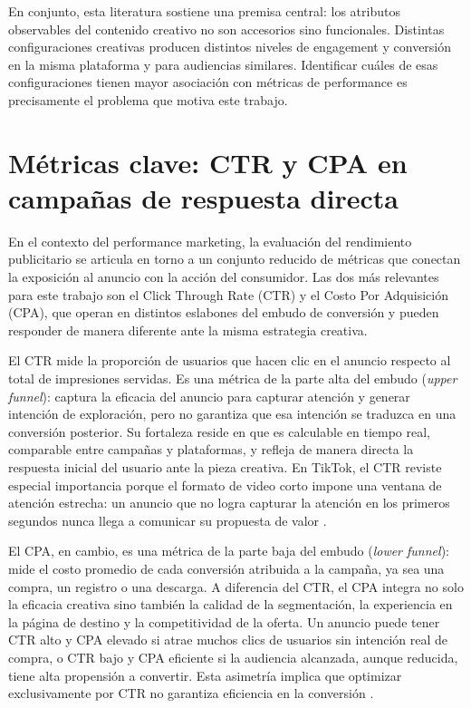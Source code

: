 \documentclass[12pt, a4paper]{report}
\begin{document}
En conjunto, esta literatura sostiene una premisa central: los atributos observables del contenido
creativo no son accesorios sino funcionales. Distintas configuraciones creativas producen distintos
niveles de engagement y conversión en la misma plataforma y para audiencias similares. Identificar
cuáles de esas configuraciones tienen mayor asociación con métricas de performance es precisamente
el problema que motiva este trabajo.

\section{Métricas clave: CTR y CPA en campañas de respuesta directa}

En el contexto del performance marketing, la evaluación del rendimiento publicitario se articula en
torno a un conjunto reducido de métricas que conectan la exposición al anuncio con la acción del
consumidor. Las dos más relevantes para este trabajo son el Click Through Rate (CTR) y el Costo Por
Adquisición (CPA), que operan en distintos eslabones del embudo de conversión y pueden responder
de manera diferente ante la misma estrategia creativa.

El CTR mide la proporción de usuarios que hacen clic en el anuncio respecto al total de impresiones
servidas. Es una métrica de la parte alta del embudo (\textit{upper funnel}): captura la eficacia del
anuncio para capturar atención y generar intención de exploración, pero no garantiza que esa intención
se traduzca en una conversión posterior. Su fortaleza reside en que es calculable en tiempo real,
comparable entre campañas y plataformas, y refleja de manera directa la respuesta inicial del usuario
ante la pieza creativa. En TikTok, el CTR reviste especial importancia porque el formato de video
corto impone una ventana de atención estrecha: un anuncio que no logra capturar la atención en los
primeros segundos nunca llega a comunicar su propuesta de valor \citep{tiktok_engagement2024}.

El CPA, en cambio, es una métrica de la parte baja del embudo (\textit{lower funnel}): mide el costo
promedio de cada conversión atribuida a la campaña, ya sea una compra, un registro o una descarga.
A diferencia del CTR, el CPA integra no solo la eficacia creativa sino también la calidad de la
segmentación, la experiencia en la página de destino y la competitividad de la oferta. Un anuncio
puede tener CTR alto y CPA elevado si atrae muchos clics de usuarios sin intención real de compra,
o CTR bajo y CPA eficiente si la audiencia alcanzada, aunque reducida, tiene alta propensión a
convertir. Esta asimetría implica que optimizar exclusivamente por CTR no garantiza eficiencia en
la conversión \citep{kantar2023}.
\end{document}
